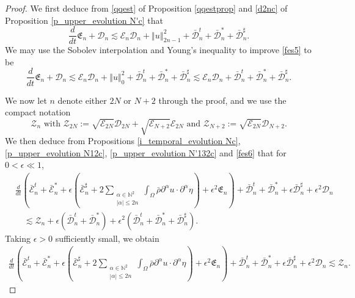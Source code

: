 \documentclass[a4paper,reqno,11pt]{amsart}
\numberwithin{equation}{section}
\providecommand{\norm}[1]{\left\Vert#1\right\Vert}
\providecommand{\sd}[1]{\mathcal{D}_{#1}}
\providecommand{\se}[1]{\mathcal{E}_{#1}}
\providecommand{\norm}[1]{\left\Vert#1\right\Vert}
\begin{document}
\begin{proof}
We first deduce from \eqref{qqest} of Proposition \ref{qqestprop} and \eqref{d2nc} of Proposition \ref{p_upper_evolution  N'c} that
 \begin{equation}\label{fes5}
 { \frac{d}{dt}}\mathfrak{E}_n  + \mathcal{D}_n
 {\lesssim} { \se{n}  }\sd{n}+\norm{ u  }_{2n-1}^2
+\bar{\mathcal{D}}_n^t+\bar{\mathcal{D}}_n^\ast+\bar{\mathcal{D}}_n^\sharp.
\end{equation}
We may use the Sobolev interpolation and Young's inequality to improve \eqref{fes5} to be
 \begin{equation}\label{fes6}
 { \frac{d}{dt}}\mathfrak{E}_n  + \mathcal{D}_n
 {\lesssim} { \se{n}  }\sd{n}+\norm{ u  }_{0}^2
+\bar{\mathcal{D}}_n^t+\bar{\mathcal{D}}_n^\ast+\bar{\mathcal{D}}_n^\sharp {\lesssim} { \se{n}  }\sd{n}
+\bar{\mathcal{D}}_n^t+\bar{\mathcal{D}}_n^\ast+\bar{\mathcal{D}}_n^\sharp.
\end{equation}

We now let $n$ denote either $2N$ or $N+2$ through the proof, and we use the compact notation
\begin{equation}
\mathcal{Z}_n\text{ with }\mathcal{Z}_{2N}:=\sqrt{ \se{2N}  }\sd{ 2N}+\sqrt{ \se{N+2}  }\se{ 2N} \text{ and }\mathcal{Z}_{N+2}:=\sqrt{ \se{2N}  }\sd{ N+2} .
\end{equation}
We then deduce from Propositions \ref{i_temporal_evolution  Nc}, \ref{p_upper_evolution  N12c}, \ref{p_upper_evolution  N'132c} and \eqref{fes6} that for $0<\epsilon\ll 1$,
\begin{equation} \label{i_te_02nc}
\begin{split}
 & \frac{d}{dt}\left(\bar{\mathcal{E}}_{n}^t+ \bar{\mathcal{E}}_{n}^*+\epsilon\left( \bar{\mathcal{E}}_{n}^\sharp+2\sum_{\substack{{\alpha}\in \mathbb{N}^2\\  |{\alpha}|\le 2n}}\int_\Omega \bar\rho \partial^\alpha     u  \cdot \partial^\alpha  \eta\right)+\epsilon^2 \mathfrak{E}_{n} \right)
+ \bar{\mathcal{D}}_{n}^t+\bar{\mathcal{D}}_{n}^*+\epsilon \bar{\mathcal{D}}_{n}^\sharp+\epsilon^2  {\mathcal{D}}_{n}
 \\&\quad {\lesssim}   \mathcal{Z}_n+ \epsilon(\bar{\mathcal{D}}_{n}^t+\bar{\mathcal{D}}_{n}^{\ast} )+\epsilon^2(\bar{\mathcal{D}}_{n}^t+\bar{\mathcal{D}}_{n}^*+ \bar{\mathcal{D}}_{n}^\sharp).
  \end{split}
\end{equation}
Taking $\epsilon>0$ sufficiently small, we obtain
\begin{equation} \label{i_te_02n1c}
\begin{split}
 \frac{d}{dt}\left(\bar{\mathcal{E}}_{n}^t+ \bar{\mathcal{E}}_{n}^*+\epsilon\left( \bar{\mathcal{E}}_{n}^\sharp+2\sum_{\substack{{\alpha}\in \mathbb{N}^2\\  |{\alpha}|\le 2n}}\int_\Omega \bar\rho \partial^\alpha     u  \cdot \partial^\alpha  \eta\right)+\epsilon^2 \mathfrak{E}_{n} \right)
+ \bar{\mathcal{D}}_{n}^t+\bar{\mathcal{D}}_{n}^*+\epsilon \bar{\mathcal{D}}_{n}^\sharp+\epsilon^2  {\mathcal{D}}_{n}
 {\lesssim}   \mathcal{Z}_n .
  \end{split}
\end{equation}


\end{proof}
\end{document}
